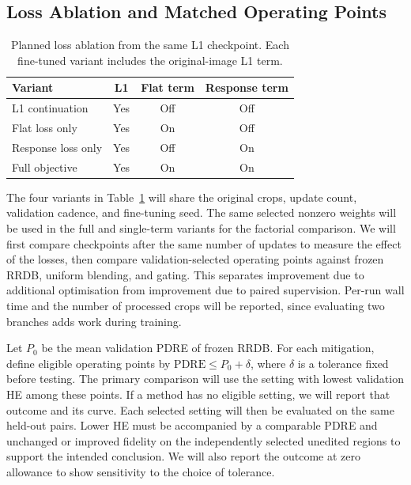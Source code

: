 \documentclass[journal]{IEEEtran}
\begin{document}
\subsection{Loss Ablation and Matched Operating Points}
\begin{table}[!t]
\centering
\caption{Planned loss ablation from the same L1 checkpoint. Each fine-tuned variant includes the original-image L1 term.}
\label{tab:loss-ablation}
\setlength{\tabcolsep}{3pt}
\begin{tabular}{@{}lccc@{}}
\toprule
Variant & L1 & Flat term & Response term \\
\midrule
L1 continuation & Yes & Off & Off \\
Flat loss only & Yes & On & Off \\
Response loss only & Yes & Off & On \\
Full objective & Yes & On & On \\
\bottomrule
\end{tabular}
\end{table}

The four variants in Table~\ref{tab:loss-ablation} will share the original crops, update count, validation cadence, and fine-tuning seed. The same selected nonzero weights will be used in the full and single-term variants for the factorial comparison. We will first compare checkpoints after the same number of updates to measure the effect of the losses, then compare validation-selected operating points against frozen RRDB, uniform blending, and gating. This separates improvement due to additional optimisation from improvement due to paired supervision. Per-run wall time and the number of processed crops will be reported, since evaluating two branches adds work during training.

Let $P_0$ be the mean validation PDRE of frozen RRDB. For each mitigation, define eligible operating points by $\mathrm{PDRE}\leq P_0+\delta$, where $\delta$ is a tolerance fixed before testing. The primary comparison will use the setting with lowest validation HE among these points. If a method has no eligible setting, we will report that outcome and its curve. Each selected setting will then be evaluated on the same held-out pairs. Lower HE must be accompanied by a comparable PDRE and unchanged or improved fidelity on the independently selected unedited regions to support the intended conclusion. We will also report the outcome at zero allowance to show sensitivity to the choice of tolerance.
\end{document}
